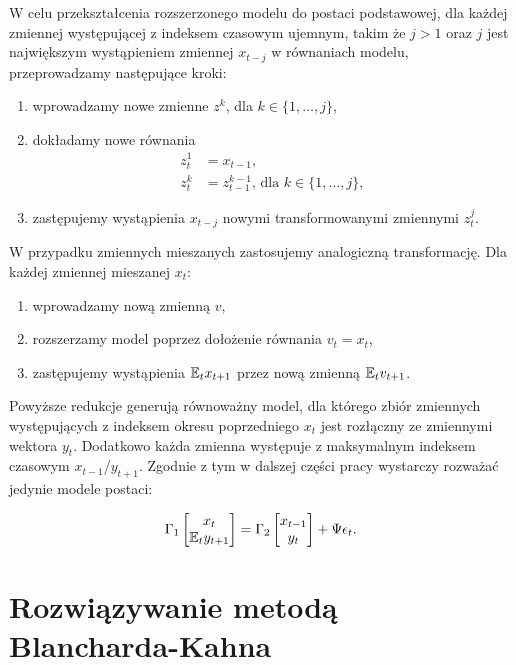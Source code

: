 W celu przekształcenia rozszerzonego modelu do postaci podstawowej, dla każdej zmiennej występującej z indeksem czasowym ujemnym, takim że $j > 1$ oraz $j$ jest największym wystąpieniem zmiennej $x_{t-j}$ w równaniach modelu, przeprowadzamy następujące kroki:
\begin{enumerate}
    \item wprowadzamy nowe zmienne $z^k$, dla $k \in \{1,\dots, j\}$,
    \item dokładamy nowe równania
    \begin{align*}
        z^1_t &= x_{t-1}, \\
        z^k_t &= z^{k-1}_{t-1} \text{, dla } k \in \{1,\dots, j\},
    \end{align*}
    \item zastępujemy wystąpienia $x_{t - j}$ nowymi transformowanymi zmiennymi $z^j_t$.
\end{enumerate}
W przypadku zmiennych mieszanych zastosujemy analogiczną transformację. Dla każdej zmiennej mieszanej $x_t$:
\begin{enumerate}
    \item wprowadzamy nową zmienną $v$,
    \item rozszerzamy model poprzez dołożenie równania $v_t = x_t$,
    \item zastępujemy wystąpienia $\mathbb{E}_t x_{t+1}$ przez nową zmienną $\mathbb{E}_t v_{t+1}$.
\end{enumerate}

Powyższe redukcje generują równoważny model, dla którego zbiór zmiennych występujących z indeksem okresu poprzedniego $x_t$ jest rozłączny ze zmiennymi wektora $y_t$. Dodatkowo każda zmienna występuje z maksymalnym indeksem czasowym $x_{t-1}$/$y_{t+1}$. Zgodnie z tym w dalszej części pracy wystarczy rozważać jedynie modele postaci:

\begin{equation*}
    \Gamma_1 \begin{bmatrix}
    x_{t} \\
    \mathbb{E}_t y_{t+1}
\end{bmatrix} = \Gamma_2 \begin{bmatrix}
    x_{t-1} \\
    y_{t}
\end{bmatrix} + \Psi \epsilon_t.
\end{equation*}

\section{Rozwiązywanie metodą Blancharda-Kahna}
\label{sec:blanchard_kahn_method}

